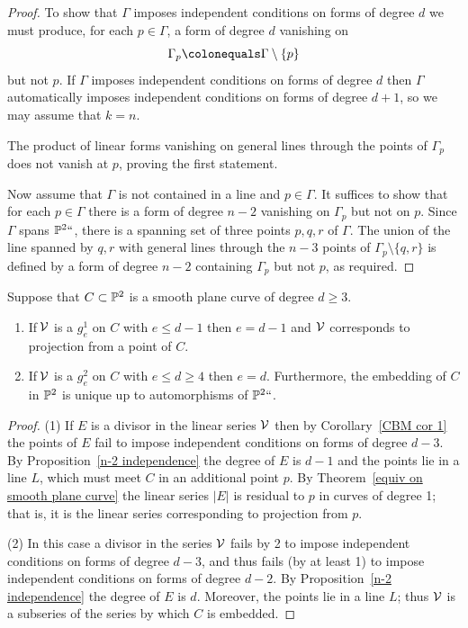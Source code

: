 \begin{proof} To show that $\Gamma$ imposes independent conditions on forms of degree $d$ we must produce, for each $p\in \Gamma$, a form of degree $d$ vanishing on
$$
\Gamma_{p}\colonequals\Gamma\setminus\{p\}
$$
 but not $p$. If $\Gamma$ imposes independent conditions on forms of degree $d$ then
 $\Gamma$ automatically imposes independent conditions on forms of degree $d+1$,
 so we may assume that $k=n$.

The product of linear forms
 vanishing on general lines through the points of $\Gamma_{p}$ does not vanish at $p$, proving the first statement.

Now assume that $\Gamma$ is not contained in a line and $p\in \Gamma$.
It suffices to show that for each $p\in \Gamma$ there is a form of
degree $n-2$ vanishing on $\Gamma_{p}$ but not on $p$. Since $\Gamma$
spans ${\mathbb P}^2` `$, there is a spanning set of three points $p,q,r$ of
$\Gamma$. The union of the line spanned by $q,r$ with general lines
through the $n-3$ points of $\Gamma_{p}\setminus\{q,r\}$ is defined by a form of degree $n-2$ containing $\Gamma_{p}$ but not $p$,
as required.
\end{proof}

\begin{corollary}\label{CBM cor 2}
 Suppose that $C\subset {\mathbb P}^2$ is a smooth plane curve of degree $d\geq 3$.

\begin{enumerate}
 \item If $\,\sV$ is a $g^1_e$ on $C$ with $e\leq d-1$ then $e = d-1$ and ${\mathcal V}$
 corresponds to projection from a point of $C$.
 \item If $\,\sV$ is a $g^2_e$ on $C$ with $e\leq d \geq 4$ then $e = d$. Furthermore,  the
  embedding of $C$ in ${\mathbb P}^2$ is unique up to automorphisms of ${\mathbb P}^2` `$.
 \end{enumerate}
\end{corollary}

\begin{proof}
(1) If $E$ is a divisor in the linear series ${\mathcal V}$ then by Corollary~\ref{CBM cor 1} the points of $E$ fail to impose
 independent conditions on forms of degree $d-3$. By Proposition~\ref{n-2 independence} the degree of $E$ is $d-1$
 and the points lie in a line $L$, which must meet $C$ in an additional point $p$. By Theorem~\ref{equiv on smooth plane curve}
 the linear series $|E|$ is residual to $p$ in curves of degree 1; that is, it is the linear series corresponding to projection from $p$.

(2) In this case a divisor in the series ${\mathcal V}$ fails by 2 to impose independent conditions on forms of degree $d-3$, and
 thus fails (by at least 1) to impose independent conditions on forms of degree $d-2$. By
  Proposition~\ref{n-2 independence} the degree of $E$ is $d$.
 Moreover, the points lie in a line $L$; thus ${\mathcal V}$ is a subseries of the series by which $C$ is embedded.
 \end{proof}

